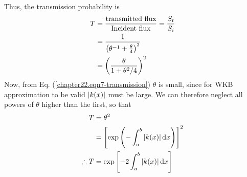 Thus, the transmission probability is
\begin{align}
\label{chapter22.eqn12-transmission}
T &= \frac{\text{transmitted flux}}{\text{Incident flux}} = \frac{S_t}{S_i} \nonumber \\
 &= \frac{1}{\left(\theta^{-1} + \frac{\theta}{4}\right)^2} \nonumber \\
 &= \qty(\frac{\theta}{1 + \theta^2/4})^2
\end{align}
Now, from Eq. (\ref{chapter22.eqn7-transmission})
 $\theta$ is small, since for WKB approximation to be valid $\abs{k(x)}$ must be large. We can therefore neglect all powers of $\theta$ higher than the first, so that
 \begin{align}
 \label{chapter22.eqn13-transmission}
	 T &= \theta^2 \nonumber \\
	 &= \left[\exp\left(-\int_{a}^{b} \abs{k(x)} \dd{x}\right)\right]^2 \nonumber\\
\therefore T	 &= \exp\qty[-2\int_{a}^{b} \abs{k(x)} \dd{x}]
 \end{align}


